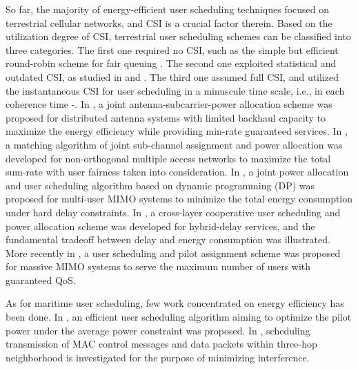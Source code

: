 \documentclass{ieeeaccess}
\begin{document}

So far, the majority of energy-efficient user scheduling techniques focused on terrestrial cellular networks, and CSI is a crucial factor therein.  
Based on the utilization degree of CSI, terrestrial user scheduling schemes can be classified into three categories. The first one required no CSI, such as the simple but efficient round-robin scheme for fair queuing \cite{p51}. The second one exploited statistical and outdated CSI, as studied in \cite{p52} and \cite{p53}. The third one assumed full CSI, and utilized the instantaneous CSI for user scheduling in a minuscule time scale, i.e., in each coherence time \cite{p3}-\cite{p7}. 
In \cite{p3}, a joint antenna-subcarrier-power allocation scheme was proposed for distributed antenna systems with limited backhaul capacity to maximize the energy efficiency while providing min-rate guaranteed services. In \cite{p6}, a matching algorithm of joint sub-channel assignment and power allocation was developed for non-orthogonal multiple access networks to maximize the total sum-rate with user fairness taken into consideration. In \cite{p4}, a joint power allocation and user scheduling algorithm based on dynamic programming (DP) was proposed for multi-user MIMO systems to minimize the total energy consumption under hard delay constraints. In \cite{p5}, a cross-layer cooperative user scheduling and power allocation scheme was developed for hybrid-delay services, and the fundamental tradeoff between delay and energy consumption was illustrated. More recently in \cite{p7}, a user scheduling and pilot assignment scheme was proposed for massive MIMO systems to serve the maximum number of users with guaranteed QoS.

As for maritime user scheduling, few work concentrated on energy efficiency has been done. In \cite{p400}, 
an efficient user scheduling algorithm aiming to optimize the pilot power under the average power constraint was proposed. 
In \cite{p401}, 
scheduling transmission of MAC control messages and data packets within three-hop neighborhood is investigated for the purpose of minimizing interference. 
\end{document}
